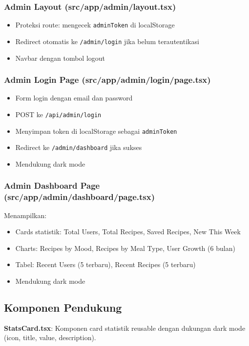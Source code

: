 \documentclass[12pt, a4paper]{article}
\begin{document}
\subsubsection{Admin Layout (src/app/admin/layout.tsx)}
\begin{itemize}
  \item Proteksi route: mengecek \texttt{adminToken} di localStorage
  \item Redirect otomatis ke \texttt{/admin/login} jika belum terautentikasi
  \item Navbar dengan tombol logout
\end{itemize}

\subsubsection{Admin Login Page (src/app/admin/login/page.tsx)}
\begin{itemize}
  \item Form login dengan email dan password
  \item POST ke \texttt{/api/admin/login}
  \item Menyimpan token di localStorage sebagai \texttt{adminToken}
  \item Redirect ke \texttt{/admin/dashboard} jika sukses
  \item Mendukung dark mode
\end{itemize}

\subsubsection{Admin Dashboard Page (src/app/admin/dashboard/page.tsx)}
Menampilkan:
\begin{itemize}
  \item Cards statistik: Total Users, Total Recipes, Saved Recipes, New This Week
  \item Charts: Recipes by Mood, Recipes by Meal Type, User Growth (6 bulan)
  \item Tabel: Recent Users (5 terbaru), Recent Recipes (5 terbaru)
  \item Mendukung dark mode
\end{itemize}

\subsection{Komponen Pendukung}
\textbf{StatsCard.tsx}: Komponen card statistik reusable dengan dukungan dark mode (icon, title, value, description).
\end{document}
